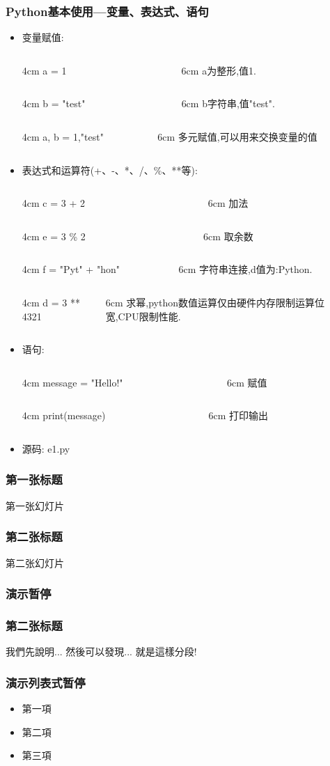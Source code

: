 \documentclass[xcolor=dvipsnames]{beamer}
\newcommand{\twoColumn}[2]{
\begin{columns}
    \begin{column}{4cm}
        {#1}
    \end{column}
    \begin{column}{6cm}
        {#2}
    \end{column}
\end{columns}
}
\begin{document}
\begin{frame}
    \frametitle{Python基本使用—变量、表达式、语句}
    \begin{itemize}
        \item 变量赋值: 
            \pause
            \twoColumn{a = 1}{a为整形,值1.}
            \pause
            \twoColumn{b = "test"}{b字符串,值"test".}
            \pause
            \twoColumn{a, b = 1,"test"}{\alert{多元赋值},可以用来交换变量的值}
            \pause
        \item 表达式和运算符(+、-、*、/、\%、**等):
            \pause
            \twoColumn{c = 3 + 2}{加法}
            \pause
            \twoColumn{e = 3 \% 2}{取余数}
            \pause
            \twoColumn{f = "Pyt" + "hon"}{字符串连接,d值为:Python.}
            \pause
            \twoColumn{d = 3 ** 4321}{\alert{求幂},python数值运算仅由硬件内存限制运算位宽,CPU限制性能.}
            \pause
        \item 语句:
            \pause
            \twoColumn{message = "Hello!"}{赋值}
            \pause
            \twoColumn{print(message)}{打印输出}
            \pause
        \item 源码: e1.py
    \end{itemize} 
\end{frame}

\begin{frame}
    \frametitle{第一张标题}
    第一张幻灯片
\end{frame}

\begin{frame}
    \frametitle{第二张标题}
    第二张幻灯片
\end{frame}

\begin{frame}
    \frametitle{演示暂停}
    \frametitle{第二张标题}
    我們先說明...  
    \pause 
    然後可以發現...  
    \pause 
    就是這樣分段! 
\end{frame}

\begin{frame}
    \frametitle{演示列表式暂停}
    \begin{itemize}
        \item 
            第一項 
            \pause
        \item 
            第二項 
            \pause 
        \item 
            第三項 
    \end{itemize} 
\end{frame}
\end{document}
